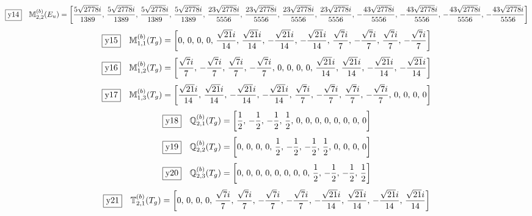 \documentclass[fleqn,10pt,landscape]{jsarticle}
\begin{document}
\begin{dmath*}
\fbox{y14}\quad \mathbb{M}_{2,2}^{(b)}(E_{u})=\left[ \frac{5 \sqrt{2778} i}{1389},\, \frac{5 \sqrt{2778} i}{1389},\, \frac{5 \sqrt{2778} i}{1389},\, \frac{5 \sqrt{2778} i}{1389},\, \frac{23 \sqrt{2778} i}{5556},\, \frac{23 \sqrt{2778} i}{5556},\, \frac{23 \sqrt{2778} i}{5556},\, \frac{23 \sqrt{2778} i}{5556},\, - \frac{43 \sqrt{2778} i}{5556},\, - \frac{43 \sqrt{2778} i}{5556},\, - \frac{43 \sqrt{2778} i}{5556},\, - \frac{43 \sqrt{2778} i}{5556} \right]
\end{dmath*}
\begin{dmath*}
\fbox{y15}\quad \mathbb{M}_{1,1}^{(b)}(T_{g})=\left[ 0,\, 0,\, 0,\, 0,\, \frac{\sqrt{21} i}{14},\, \frac{\sqrt{21} i}{14},\, - \frac{\sqrt{21} i}{14},\, - \frac{\sqrt{21} i}{14},\, \frac{\sqrt{7} i}{7},\, - \frac{\sqrt{7} i}{7},\, \frac{\sqrt{7} i}{7},\, - \frac{\sqrt{7} i}{7} \right]
\end{dmath*}
\begin{dmath*}
\fbox{y16}\quad \mathbb{M}_{1,2}^{(b)}(T_{g})=\left[ \frac{\sqrt{7} i}{7},\, - \frac{\sqrt{7} i}{7},\, \frac{\sqrt{7} i}{7},\, - \frac{\sqrt{7} i}{7},\, 0,\, 0,\, 0,\, 0,\, \frac{\sqrt{21} i}{14},\, \frac{\sqrt{21} i}{14},\, - \frac{\sqrt{21} i}{14},\, - \frac{\sqrt{21} i}{14} \right]
\end{dmath*}
\begin{dmath*}
\fbox{y17}\quad \mathbb{M}_{1,3}^{(b)}(T_{g})=\left[ \frac{\sqrt{21} i}{14},\, \frac{\sqrt{21} i}{14},\, - \frac{\sqrt{21} i}{14},\, - \frac{\sqrt{21} i}{14},\, \frac{\sqrt{7} i}{7},\, - \frac{\sqrt{7} i}{7},\, \frac{\sqrt{7} i}{7},\, - \frac{\sqrt{7} i}{7},\, 0,\, 0,\, 0,\, 0 \right]
\end{dmath*}
\begin{dmath*}
\fbox{y18}\quad \mathbb{Q}_{2,1}^{(b)}(T_{g})=\left[ \frac{1}{2},\, - \frac{1}{2},\, - \frac{1}{2},\, \frac{1}{2},\, 0,\, 0,\, 0,\, 0,\, 0,\, 0,\, 0,\, 0 \right]
\end{dmath*}
\begin{dmath*}
\fbox{y19}\quad \mathbb{Q}_{2,2}^{(b)}(T_{g})=\left[ 0,\, 0,\, 0,\, 0,\, \frac{1}{2},\, - \frac{1}{2},\, - \frac{1}{2},\, \frac{1}{2},\, 0,\, 0,\, 0,\, 0 \right]
\end{dmath*}
\begin{dmath*}
\fbox{y20}\quad \mathbb{Q}_{2,3}^{(b)}(T_{g})=\left[ 0,\, 0,\, 0,\, 0,\, 0,\, 0,\, 0,\, 0,\, \frac{1}{2},\, - \frac{1}{2},\, - \frac{1}{2},\, \frac{1}{2} \right]
\end{dmath*}
\begin{dmath*}
\fbox{y21}\quad \mathbb{T}_{2,1}^{(b)}(T_{g})=\left[ 0,\, 0,\, 0,\, 0,\, \frac{\sqrt{7} i}{7},\, \frac{\sqrt{7} i}{7},\, - \frac{\sqrt{7} i}{7},\, - \frac{\sqrt{7} i}{7},\, - \frac{\sqrt{21} i}{14},\, \frac{\sqrt{21} i}{14},\, - \frac{\sqrt{21} i}{14},\, \frac{\sqrt{21} i}{14} \right]
\end{dmath*}
\end{document}
